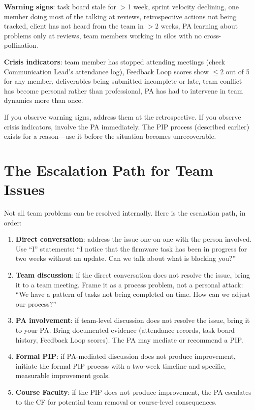 \textbf{Warning signs}: task board stale for $>$1 week, sprint velocity declining, one member doing most of the talking at reviews, retrospective actions not being tracked, client has not heard from the team in $>$2 weeks, PA learning about problems only at reviews, team members working in silos with no cross-pollination.

\textbf{Crisis indicators}: team member has stopped attending meetings (check Communication Lead's attendance log), Feedback Loop scores show $\leq$2 out of 5 for any member, deliverables being submitted incomplete or late, team conflict has become personal rather than professional, PA has had to intervene in team dynamics more than once.

If you observe warning signs, address them at the retrospective. If you observe crisis indicators, involve the PA immediately. The PIP process (described earlier) exists for a reason---use it before the situation becomes unrecoverable.

\section{The Escalation Path for Team Issues}
Not all team problems can be resolved internally. Here is the escalation path, in order:

\begin{enumerate}[nosep,leftmargin=1.5em]
\item \textbf{Direct conversation}: address the issue one-on-one with the person involved. Use ``I'' statements: ``I notice that the firmware task has been in progress for two weeks without an update. Can we talk about what is blocking you?''
\item \textbf{Team discussion}: if the direct conversation does not resolve the issue, bring it to a team meeting. Frame it as a process problem, not a personal attack: ``We have a pattern of tasks not being completed on time. How can we adjust our process?''
\item \textbf{PA involvement}: if team-level discussion does not resolve the issue, bring it to your PA. Bring documented evidence (attendance records, task board history, Feedback Loop scores). The PA may mediate or recommend a PIP.
\item \textbf{Formal PIP}: if PA-mediated discussion does not produce improvement, initiate the formal PIP process with a two-week timeline and specific, measurable improvement goals.
\item \textbf{Course Faculty}: if the PIP does not produce improvement, the PA escalates to the CF for potential team removal or course-level consequences.
\end{enumerate}

